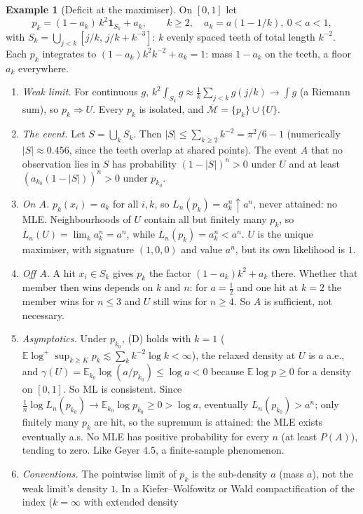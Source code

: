 \documentclass[11pt]{article}
\newcommand{\E}{\mathbb E}
\newcommand{\bM}{\overline{\mathcal M}}
\newcommand{\bL}{\overline L}
\theoremstyle{definition}
\newtheorem{example}[theorem]{Example}
\theoremstyle{remark}
\begin{document}
\begin{example}[Deficit at the maximiser]\label{ex:deficit}
On $[0,1]$ let
\[
 p_k=(1-a_k)\,k^2\mathbf 1_{S_k}+a_k,\qquad k\ge2,\quad a_k=a(1-1/k),\ 0<a<1,
\]
with $S_k=\bigcup_{j<k}[j/k,\,j/k+k^{-3}]$: $k$ evenly spaced teeth of
total length $k^{-2}$. Each $p_k$ integrates to
$(1-a_k)k^2k^{-2}+a_k=1$: mass $1-a_k$ on the teeth, a floor $a_k$
everywhere.
\begin{enumerate}
\item \emph{Weak limit.} For continuous $g$,
  $k^2\int_{S_k}g\approx\frac1k\sum_{j<k}g(j/k)\to\int g$ (a Riemann sum), so
  $p_k\Rightarrow U$. Every $p_k$ is isolated, and $\bM=\{p_k\}\cup\{U\}$.
\item \emph{The event.} Let $S=\bigcup_kS_k$. Then
  $|S|\le\sum_{k\ge2}k^{-2}=\pi^2/6-1$ (numerically $|S|\approx0.456$, since
  the teeth overlap at shared points). The event $A$ that no observation
  lies in $S$ has probability $(1-|S|)^n>0$ under $U$ and at least
  $(a_{k_0}(1-|S|))^n>0$ under $p_{k_0}$.
\item \emph{On $A$.} $p_k(x_i)=a_k$ for all $i,k$, so
  $L_n(p_k)=a_k^n\uparrow a^n$, never attained: no MLE. Neighbourhoods of
  $U$ contain all but finitely many $p_k$, so $\bL_n(U)=\lim_k a_k^n=a^n$,
  while $\bL_n(p_k)=a_k^n<a^n$. $U$ is the unique maximiser, with
  signature $(1,0,0)$ and value $a^n$, but its own likelihood is $1$.
\item \emph{Off $A$.} A hit $x_i\in S_k$ gives $p_k$ the factor
  $(1-a_k)k^2+a_k$ there. Whether that member then wins depends on $k$ and
  $n$: for $a=\frac12$ and one hit at $k=2$ the member wins for $n\le3$ and
  $U$ still wins for $n\ge4$. So $A$ is sufficient, not necessary.
\item \emph{Asymptotics.} Under $p_{k_0}$, (D) holds with $k=1$
  ($\E\log^+\sup_{k\ge K}p_k\lesssim\sum_kk^{-2}\log k<\infty$), the relaxed
  density at $U$ is $a$ a.e., and
  $\gamma(U)=\E_{k_0}\log(a/p_{k_0})\le\log a<0$ because $\E\log p\ge0$ for
  a density on $[0,1]$. So ML is consistent. Since
  $\frac1n\log L_n(p_{k_0})\to\E_{k_0}\log p_{k_0}\ge0>\log a$, eventually
  $L_n(p_{k_0})>a^n$; only finitely many $p_k$ are hit, so the supremum is
  attained: the MLE exists eventually a.s. No MLE has positive probability
  for every $n$ (at least $P(A)$), tending to zero. Like Geyer 4.5, a
  finite-sample phenomenon.
\item \emph{Conventions.} The pointwise limit of $p_k$ is the sub-density
  $a$ (mass $a$), not the weak limit's density $1$. In a Kiefer--Wolfowitz
  or Wald compactification of the index ($k=\infty$ with extended density

\end{enumerate}
\end{example}
\end{document}
